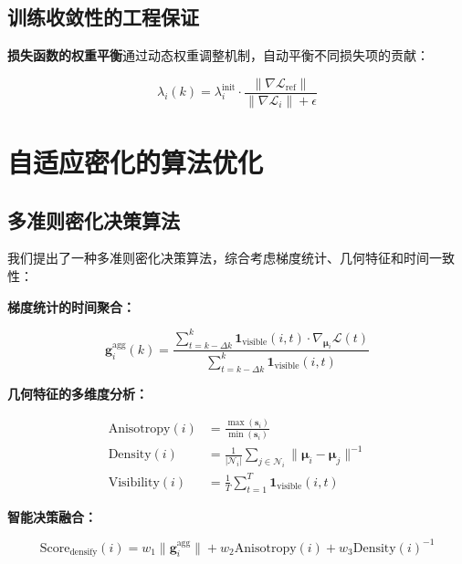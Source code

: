 \subsection{训练收敛性的工程保证}

\textbf{损失函数的权重平衡}通过动态权重调整机制，自动平衡不同损失项的贡献：

\begin{equation}
\lambda_i(k) = \lambda_i^{\text{init}} \cdot \frac{\|\nabla \mathcal{L}_{\text{ref}}\|}{\|\nabla \mathcal{L}_i\| + \epsilon}
\label{eq:adaptive_loss_weighting}
\end{equation}

\section{自适应密化的算法优化}

\subsection{多准则密化决策算法}

我们提出了一种多准则密化决策算法，综合考虑梯度统计、几何特征和时间一致性：

\textbf{梯度统计的时间聚合：}

\begin{equation}
\mathbf{g}_i^{\text{agg}}(k) = \frac{\sum_{t=k-\Delta k}^{k} \mathbf{1}_{\text{visible}}(i, t) \cdot \nabla_{\boldsymbol{\mu}_i} \mathcal{L}(t)}{\sum_{t=k-\Delta k}^{k} \mathbf{1}_{\text{visible}}(i, t)}
\label{eq:temporal_gradient_aggregation}
\end{equation}

\textbf{几何特征的多维度分析：}

\begin{align}
\text{Anisotropy}(i) &= \frac{\max(\mathbf{s}_i)}{\min(\mathbf{s}_i)} \\
\text{Density}(i) &= \frac{1}{|\mathcal{N}_i|} \sum_{j \in \mathcal{N}_i} \|\boldsymbol{\mu}_i - \boldsymbol{\mu}_j\|^{-1} \\
\text{Visibility}(i) &= \frac{1}{T} \sum_{t=1}^{T} \mathbf{1}_{\text{visible}}(i, t)
\label{eq:multi_criteria_analysis}
\end{align}

\textbf{智能决策融合：}

\begin{equation}
\text{Score}_{\text{densify}}(i) = w_1 \|\mathbf{g}_i^{\text{agg}}\| + w_2 \text{Anisotropy}(i) + w_3 \text{Density}(i)^{-1}
\label{eq:densification_score}
\end{equation}

